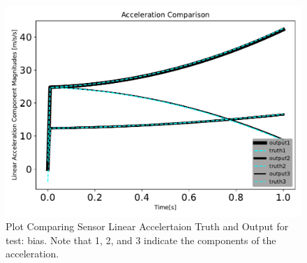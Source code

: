 \begin{figure}[htbp]\centerline{\includegraphics[height=0.7\textwidth, keepaspectratio]{AutoTeX/biasaccelComparison}}\caption{Plot Comparing Sensor Linear Accelertaion Truth and Output for test: bias. Note that 1, 2, and 3 indicate the components of the acceleration.}\label{fig:biasaccelComparison}\end{figure}